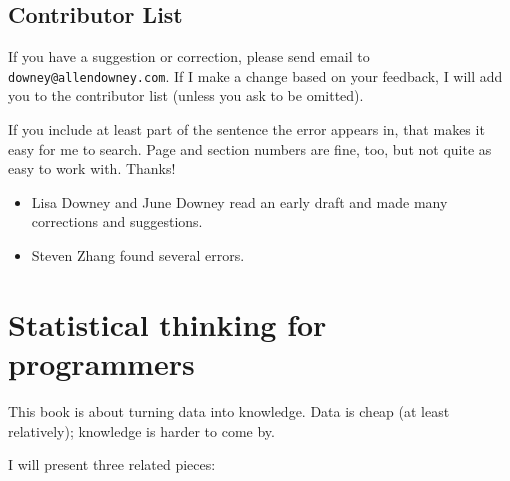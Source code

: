 \documentclass[12pt]{book}
\begin{document}



\section*{Contributor List}


If you have a suggestion or correction, please send email to 
{\tt downey@allendowney.com}.  If I make a change based on your
feedback, I will add you to the contributor list
(unless you ask to be omitted).

If you include at least part of the sentence the
error appears in, that makes it easy for me to search.  Page and
section numbers are fine, too, but not quite as easy to work with.
Thanks!

\small

\begin{itemize}

\item Lisa Downey and June Downey read an early draft and made many
corrections and suggestions.

\item Steven Zhang found several errors.


\end{itemize}

\normalsize

\clearemptydoublepage

\begin{latexonly}

\tableofcontents

\clearemptydoublepage

\end{latexonly}

\mainmatter


\chapter{Statistical thinking for programmers}
\label{intro}

This book is about turning data into knowledge.  Data is cheap (at
least relatively); knowledge is harder to come by.

I will present three related pieces:
\end{document}
